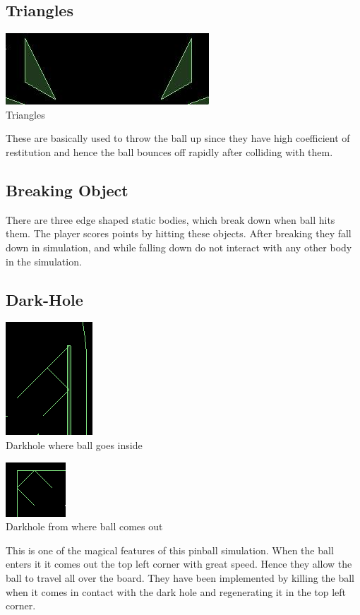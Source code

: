 \documentclass[11pt]{article}
\begin{document}
\subsection{Triangles}
\begin{center}
\includegraphics[scale=0.5]{../plots/triangles.jpg}\\
Triangles
\end{center}
These are basically used to throw the ball up since they have high coefficient of restitution and hence the ball bounces off rapidly after colliding with them. 

\subsection{Breaking Object}
There are three edge shaped static bodies, which break down when ball hits them. The player scores points by hitting these objects. After breaking they fall down in simulation, and while falling down do not interact with any other body in the simulation.

\subsection{Dark-Hole}
\begin{center}
\includegraphics[scale=0.5]{../plots/darkhole1.png}\\
Darkhole where ball goes inside
\end{center}
\begin{center}
\includegraphics[scale=0.5]{../plots/darkhole2.png}\\
Darkhole from where ball comes out
\end{center}
This is one of the magical features of this pinball simulation. When the ball enters it it comes out the top left corner with great speed. Hence they allow the ball to travel all over the board. They have been implemented by killing the ball when it comes in contact with the dark hole and regenerating it in the top left corner.
\end{document}

